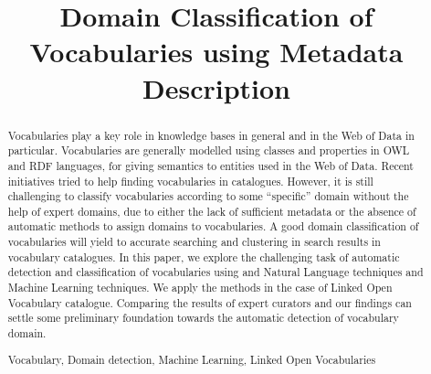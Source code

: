 \documentclass[runningheads,a4paper]{llncs}
\newcommand{\keywords}[1]{\par\addvspace\baselineskip
\noindent\keywordname\enspace\ignorespaces#1}
\begin{document}
\title{Domain Classification of Vocabularies using Metadata Description}






\maketitle


\begin{abstract}
Vocabularies play a key role in knowledge bases in general and in the Web of Data in particular. Vocabularies are generally modelled using classes and properties in OWL and RDF languages, for giving semantics to entities used in the Web of Data. Recent initiatives tried to help finding vocabularies in catalogues. However, it is still challenging to classify  vocabularies according to some ``specific'' domain without the help of expert domains, due to either the lack of sufficient metadata or the absence of automatic methods to assign domains to vocabularies.  A good domain classification of vocabularies will yield to accurate searching and clustering in search results in vocabulary catalogues. In this paper, we explore the challenging task of automatic detection and classification of vocabularies using and Natural Language techniques and Machine Learning techniques. We apply the methods in the case of Linked Open Vocabulary catalogue. Comparing the results of expert curators and our findings can settle some preliminary foundation towards the automatic detection of vocabulary domain. 

\keywords{Vocabulary, Domain detection, Machine Learning, Linked Open Vocabularies }
\end{abstract}
\end{document}
